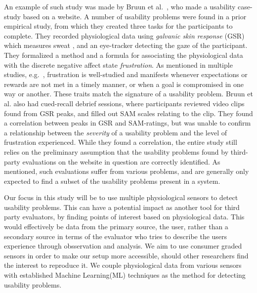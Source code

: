 An example of such study was made by Bruun et al.~\cite{LH-paper}, who made a usability case-study based on a website.
A number of usability problems were found in a prior empirical study, from which they created three tasks for the participants to complete.
They recorded physiological data using \textit{galvanic skin response} (GSR) which measures sweat \cite{gsr_calibration}, and an eye-tracker detecting the gaze of the participant.
They formalized a method and a formula for associating the physiological data with the discrete negative affect state \textit{frustration}.
As mentioned in multiple studies, e.g.~\cite{LH-paper,frustration_with_computers}, frustration is well-studied
and manifests whenever expectations or rewards are not met in a timely manner, or when a goal is compromised in one way or another.
These traits match the signature of a usability problem.
Bruun et al. also had cued-recall debrief sessions, where participants reviewed video clips found from GSR peaks, and filled out SAM scales relating to the clip. 
They found a correlation between peaks in GSR and SAM-ratings, but was unable to confirm a relationship between the
\textit{severity} of a usability problem and the level of frustration experienced.
While they found a correlation, the entire study still relies on the preliminary assumption that the usability problems found by
third-party evaluations on the website in question are correctly identified.
As mentioned, such evaluations suffer from various problems, and are generally only expected to find a subset of the usability problems present in a system. 

Our focus in this study will be to use multiple physiological sensors to detect usability problems.
This can have a potential impact as another tool for third party evaluators, by finding points of interest based on physiological data. 
This would effectively be data from the primary source, the user, rather than a secondary source in terms of the evaluator who tries to describe the users experience through obsservation and analysis. 
We aim to use consumer graded sensors in order to make our setup more accessible, should other researchers find the interest to reproduce
it. We couple physiological data from various sensors with established Machine Learning(ML) techniques as the method for
detecting usability problems.


%
   

